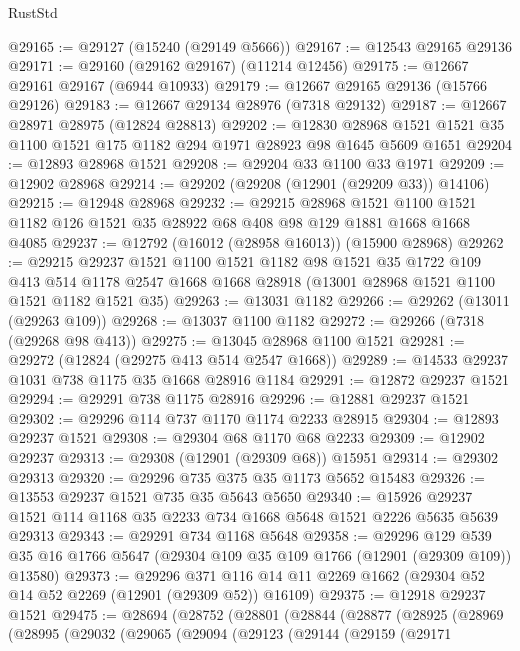 \begin{lexlean}{RustStd}
\begin{coremodule}
@29165 := @29127 (@15240 (@29149 @5666))
@29167 := @12543 @29165 @29136
@29171 := @29160 (@29162 @29167) (@11214 @12456)
@29175 := @12667 @29161 @29167 (@6944 @10933)
@29179 := @12667 @29165 @29136 (@15766 @29126)
@29183 := @12667 @29134 @28976 (@7318 @29132)
@29187 := @12667 @28971 @28975 (@12824 @28813)
@29202 := @12830
    @28968
    @1521
    @1521
    @35
    @1100
    @1521
    @175
    @1182
    @294
    @1971
    @28923
    @98
    @1645
    @5609
    @1651
@29204 := @12893 @28968 @1521
@29208 := @29204 @33 @1100 @33 @1971
@29209 := @12902 @28968
@29214 := @29202 (@29208 (@12901 (@29209 @33)) @14106)
@29215 := @12948 @28968
@29232 := @29215
    @28968
    @1521
    @1100
    @1521
    @1182
    @126
    @1521
    @35
    @28922
    @68
    @408
    @98
    @129
    @1881
    @1668
    @1668
    @4085
@29237 := @12792 (@16012 (@28958 @16013)) (@15900 @28968)
@29262 := @29215
    @29237
    @1521
    @1100
    @1521
    @1182
    @98
    @1521
    @35
    @1722
    @109
    @413
    @514
    @1178
    @2547
    @1668
    @1668
    @28918
    (@13001 @28968 @1521 @1100 @1521 @1182 @1521 @35)
@29263 := @13031 @1182
@29266 := @29262 (@13011 (@29263 @109))
@29268 := @13037 @1100 @1182
@29272 := @29266 (@7318 (@29268 @98 @413))
@29275 := @13045 @28968 @1100 @1521
@29281 := @29272 (@12824 (@29275 @413 @514 @2547 @1668))
@29289 := @14533 @29237 @1031 @738 @1175 @35 @1668 @28916 @1184
@29291 := @12872 @29237 @1521
@29294 := @29291 @738 @1175 @28916
@29296 := @12881 @29237 @1521
@29302 := @29296 @114 @737 @1170 @1174 @2233 @28915
@29304 := @12893 @29237 @1521
@29308 := @29304 @68 @1170 @68 @2233
@29309 := @12902 @29237
@29313 := @29308 (@12901 (@29309 @68)) @15951
@29314 := @29302 @29313
@29320 := @29296 @735 @375 @35 @1173 @5652 @15483
@29326 := @13553 @29237 @1521 @735 @35 @5643 @5650
@29340 := @15926 @29237 @1521 @114 @1168 @35 @2233 @734 @1668 @5648 @1521 @2226 @5635 @5639 @29313
@29343 := @29291 @734 @1168 @5648
@29358 := @29296
    @129
    @539
    @35
    @16
    @1766
    @5647
    (@29304 @109 @35 @109 @1766 (@12901 (@29309 @109)) @13580)
@29373 := @29296
    @371
    @116
    @14
    @11
    @2269
    @1662
    (@29304 @52 @14 @52 @2269 (@12901 (@29309 @52)) @16109)
@29375 := @12918 @29237 @1521
@29475 := @28694
    (@28752
      (@28801
        (@28844
          (@28877
            (@28925
              (@28969
                (@28995
                  (@29032
                    (@29065
                      (@29094
                        (@29123
                          (@29144
                            (@29159
                              (@29171

\end{coremodule}
\end{lexlean}
